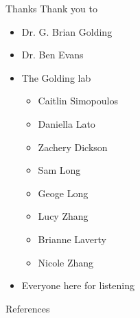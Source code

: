 \documentclass[dvipsnames]{beamer}
\begin{document}
\begin{frame}{Thanks}
    Thank you to
    \begin{itemize}
        \item Dr. G. Brian Golding
        \item Dr. Ben Evans
        \item The Golding lab
            \begin{itemize}
                \item Caitlin Simopoulos
                \item Daniella Lato
                \item Zachery Dickson
                \item Sam Long
                \item Geoge Long
                \item Lucy Zhang
                \item Brianne Laverty
                \item Nicole Zhang
            \end{itemize}
        \item Everyone here for listening
    \end{itemize}
\end{frame}
\begin{frame}{References}
    \printbibliography
\end{frame}
\end{document}
